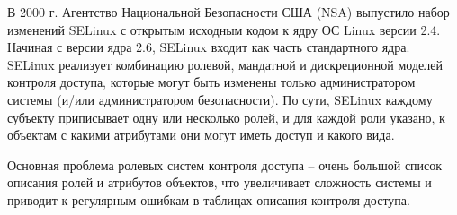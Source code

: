 В 2000 г. Агентство Национальной Безопасности США (NSA) выпустило набор изменений SELinux с открытым исходным кодом к ядру ОС Linux версии 2.4. Начиная с версии ядра 2.6, SELinux входит как часть стандартного ядра. SELinux реализует комбинацию ролевой, мандатной и дискреционной моделей контроля доступа, которые могут быть изменены только администратором системы (и/или администратором безопасности). По сути, SELinux каждому субъекту приписывает одну или несколько ролей, и для каждой роли указано, к объектам с какими атрибутами они могут иметь доступ и какого вида.

Основная проблема ролевых систем контроля доступа -- очень большой список описания ролей и атрибутов объектов, что увеличивает сложность системы и приводит к регулярным ошибкам в таблицах описания контроля доступа.
